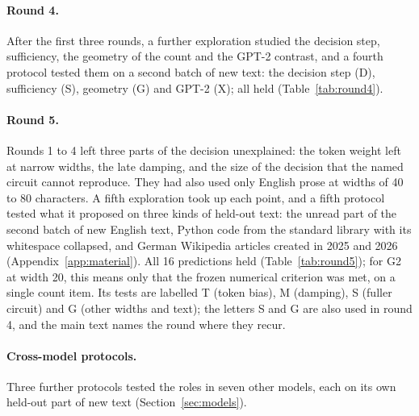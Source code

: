 \documentclass[11pt,a4paper]{article}
\begin{document}
\paragraph{Round 4.} After the first three rounds, a further exploration studied the decision step, sufficiency, the geometry of the count and the GPT-2 contrast, and a fourth protocol tested them on a second batch of new text: the decision step (D), sufficiency (S), geometry (G) and GPT-2 (X); all held (Table~\ref{tab:round4}).

\paragraph{Round 5.} Rounds 1 to 4 left three parts of the decision unexplained: the token weight left at narrow widths, the late damping, and the size of the decision that the named circuit cannot reproduce. They had also used only English prose at widths of 40 to 80 characters. A fifth exploration took up each point, and a fifth protocol tested what it proposed on three kinds of held-out text: the unread part of the second batch of new English text, Python code from the standard library with its whitespace collapsed, and German Wikipedia articles created in 2025 and 2026 (Appendix~\ref{app:material}). All 16 predictions held (Table~\ref{tab:round5}); for G2 at width 20, this means only that the frozen numerical criterion was met, on a single count item. Its tests are labelled T (token bias), M (damping), S (fuller circuit) and G (other widths and text); the letters S and G are also used in round 4, and the main text names the round where they recur.

\paragraph{Cross-model protocols.} Three further protocols tested the roles in seven other models, each on its own held-out part of new text (Section~\ref{sec:models}).
\end{document}
